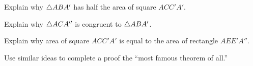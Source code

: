 \begin{prob}
Explain why $\triangle ABA'$ has half the area of square $ACC'A'$.
\end{prob}

\begin{prob}
Explain why $\triangle ACA''$ is congruent to $\triangle ABA'$. 
\end{prob}

\begin{prob}
Explain why area of square $ACC'A'$ is equal to the area of rectangle
$AEE'A''$.
\end{prob}


\begin{prob}
Use similar ideas to complete a proof the ``most famous theorem of
all.''
\end{prob}


